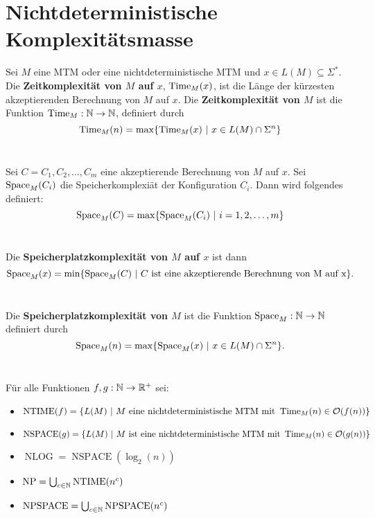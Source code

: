 \section{Nichtdeterministische Komplexitätsmasse}

\begin{definition}
Sei \(M\) eine MTM oder eine nichtdeterministische MTM und \(x \in L(M) \subseteq \Sigma^*\). Die \textbf{Zeitkomplexität von \(M\) auf \(x\)}, \(\operatorname{Time}_M(x)\), ist die Länge der kürzesten akzeptierenden Berechnung von \(M\) auf \(x\). Die \textbf{Zeitkomplexität von \(M\)} ist die Funktion \(\operatorname{Time}_M: \mathbb{N} \to \mathbb{N}\), definiert durch
\[
\operatorname{Time}_M(n) = \max \{ \operatorname{Time}_M(x) \ |\ x \in L(M) \cap \Sigma^n \}
\]\\
\end{definition}

\begin{definition}
Sei \(C = C_1, C_2, \ldots, C_m\) eine akzeptierende Berechnung von \(M\) auf \(x\). Sei \(\operatorname{Space}_M(C_i)\) die Speicherkomplexiät der Konfiguration \(C_i\). Dann wird folgendes definiert:
\[
\operatorname{Space}_M(C) = \max \{\operatorname{Space}_M(C_i) \ |\ i = 1, 2, \ldots, m \}
\]\\
\end{definition}

\begin{definition}
Die \textbf{Speicherplatzkomplexität von \(M\) auf \(x\)} ist dann
\[
\operatorname{Space}_M(x) = \min \{ \operatorname{Space}_M(C) \ |\ C \text{ ist eine akzeptierende Berechnung von M auf x}\}.
\] \\
\end{definition}

\begin{definition}
Die \textbf{Speicherplatzkomplexität von \(M\)} ist die Funktion \(\operatorname{Space}_M: \mathbb{N} \to \mathbb{N}\) definiert durch
\[
\operatorname{Space}_M(n) = \max \{ \operatorname{Space}_M(x) \ |\ x \in L(M) \cap \Sigma^n \}.
\]\\
\end{definition}

\begin{definition}
Für alle Funktionen \(f, g: \mathbb{N} \to \mathbb{R}^+\) sei:
\begin{itemize}
  \item \(\operatorname{NTIME}(f) = \{ L(M) \ |\ M \text{ eine nichtdeterministische MTM mit } \Time_M(n) \in \mathcal{O}(f(n)) \}\)
  \item \( \operatorname{NSPACE}(g) = \{ L(M) \ |\ M \text{ ist eine nichtdeterministische MTM mit } \Time_M(n) \in \mathcal{O}(g(n)) \} \)
  \item \( \operatorname{NLOG} = \operatorname{NSPACE}(\log_2(n)) \)
  \item \( \operatorname{NP} = \bigcup_{c \in \mathbb{N}} \operatorname{NTIME}(n^c) \)
  \item \( \operatorname{NPSPACE} = \bigcup_{c \in \mathbb{N}} \operatorname{NPSPACE}(n^c) \)\\
\end{itemize}
\end{definition}

